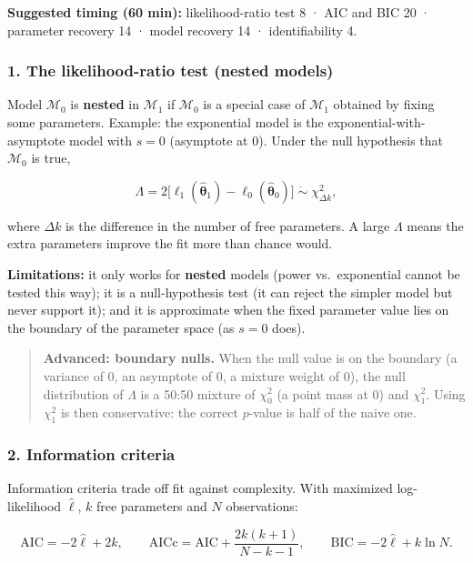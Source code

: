 \textbf{Suggested timing (60 min):} likelihood-ratio test 8 · AIC and
BIC 20 · parameter recovery 14 · model recovery 14 · identifiability 4.

\subsubsection{1. The likelihood-ratio test (nested models)}

Model \(\mathcal{M}_0\) is \textbf{nested} in \(\mathcal{M}_1\) if
\(\mathcal{M}_0\) is a special case of \(\mathcal{M}_1\) obtained by
fixing some parameters. Example: the exponential model is the
exponential-with-asymptote model with \(s = 0\) (asymptote at 0). Under
the null hypothesis that \(\mathcal{M}_0\) is true,

\[
\Lambda = 2\big[\ell_1(\hat{\boldsymbol\theta}_1) - \ell_0(\hat{\boldsymbol\theta}_0)\big] \;\dot\sim\; \chi^2_{\Delta k},
\]

where \(\Delta k\) is the difference in the number of free parameters. A
large \(\Lambda\) means the extra parameters improve the fit more than
chance would.

\textbf{Limitations:} it only works for \textbf{nested} models (power
vs.~exponential cannot be tested this way); it is a null-hypothesis test
(it can reject the simpler model but never support it); and it is
approximate when the fixed parameter value lies on the boundary of the
parameter space (as \(s = 0\) does).

\begin{quote}
\textbf{Advanced: boundary nulls.} When the null value is on the
boundary (a variance of 0, an asymptote of 0, a mixture weight of 0),
the null distribution of \(\Lambda\) is a 50:50 mixture of \(\chi^2_0\)
(a point mass at 0) and \(\chi^2_1\). Using \(\chi^2_1\) is then
conservative: the correct \(p\)-value is half of the naive one.
\end{quote}

\subsubsection{2. Information criteria}

Information criteria trade off fit against complexity. With maximized
log-likelihood \(\hat\ell\), \(k\) free parameters and \(N\)
observations:

\[
\mathrm{AIC} = -2\hat\ell + 2k, \qquad
\mathrm{AICc} = \mathrm{AIC} + \frac{2k(k+1)}{N - k - 1}, \qquad
\mathrm{BIC} = -2\hat\ell + k \ln N.
\]

